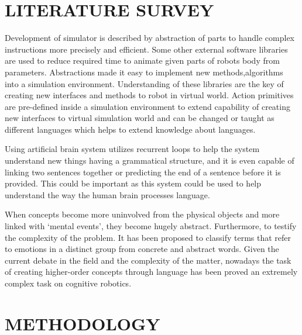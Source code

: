 \documentclass[reqno,12pt,oneside]{report}
\begin{document}
\chapter{LITERATURE SURVEY}

Development of simulator is described by abstraction of parts to handle complex instructions more precisely and efficient. Some other external software libraries are used to reduce required time to animate given parts of robots body from parameters. Abstractions made it easy to implement new methods,algorithms into a simulation environment. Understanding of these libraries are the key of creating new interfaces and methods to robot in virtual world.
Action primitives are pre-defined inside a simulation environment to extend capability of creating new interfaces to virtual simulation world and can be changed or taught as different languages which helps to extend knowledge about languages.\cite{angelo}

Using artificial brain system utilizes recurrent loops to help the system understand new things having a grammatical structure, and it is even capable of linking two sentences together or predicting the end of a sentence before it is provided. This could be important as this system could be used to help understand the way the human brain processes language.\cite{xavier}

When concepts become more uninvolved from the physical objects and more linked with ‘mental events’, they become hugely abstract. Furthermore, to testify the complexity of the problem. It has been proposed to classify terms that refer to emotions in a distinct group from concrete and abstract words. Given the current debate in the field and the complexity of the matter, nowadays the task of creating higher-order concepts through language has been proved an extremely complex task on cognitive robotics.\cite{venuto}
\newpage


\chapter{METHODOLOGY}
\end{document}

